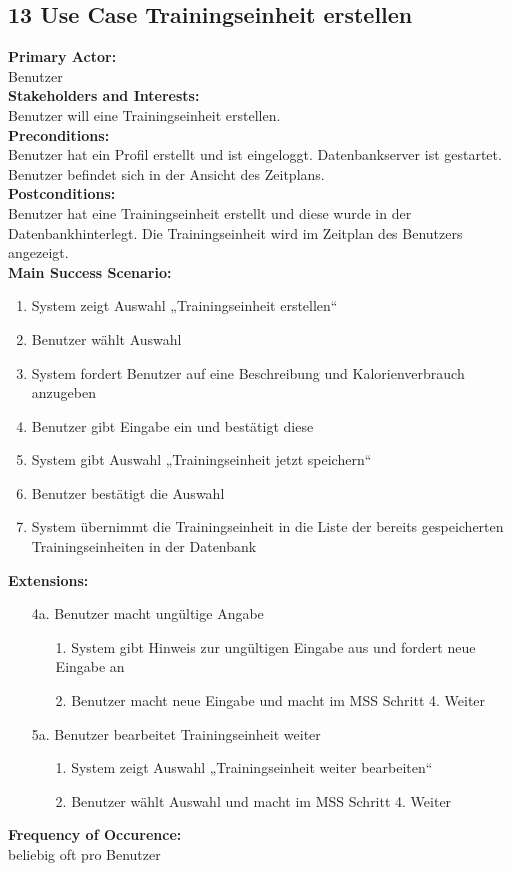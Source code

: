 \documentclass[12pt,a4paper,onecolumn]{article}
\begin{document}
\subsection{13 Use Case  Trainingseinheit erstellen}
\textbf{Primary Actor:}\\ Benutzer\\
\textbf{Stakeholders and Interests:}\\
Benutzer will eine \gls{Trainingseinheit} erstellen.\\
\textbf{Preconditions:} \\ Benutzer hat ein Profil erstellt und ist eingeloggt. 
Datenbankserver ist gestartet. Benutzer befindet sich in der Ansicht des \gls{Zeitplan}s.\\
\textbf{Postconditions:}\\Benutzer hat eine \gls{Trainingseinheit} erstellt und diese wurde in der Datenbankhinterlegt. Die Trainingseinheit wird im \gls{Zeitplan} des Benutzers angezeigt.\\
\textbf{Main Success Scenario:}
\begin{enumerate}
    \item System zeigt Auswahl „\gls{Trainingseinheit} erstellen“
    \item Benutzer wählt Auswahl
    \item System fordert Benutzer auf eine Beschreibung und Kalorienverbrauch anzugeben
    \item Benutzer gibt Eingabe ein und bestätigt diese
    \item System gibt Auswahl „\gls{Trainingseinheit} jetzt speichern“
    \item Benutzer bestätigt die Auswahl
    \item System übernimmt die \gls{Trainingseinheit} in die Liste der bereits gespeicherten \gls{Trainingseinheit}en in der Datenbank
\end{enumerate}
\textbf{Extensions:}
\begin{enumerate}
    \item [4a.]   Benutzer macht ungültige Angabe
    \begin{enumerate}
        \item[1.]System gibt Hinweis zur ungültigen Eingabe aus und fordert neue Eingabe an
        \item[2.]Benutzer macht neue Eingabe und macht im MSS Schritt 4. Weiter
    \end{enumerate}
    \item [5a.]Benutzer bearbeitet \gls{Trainingseinheit} weiter
    \begin{enumerate}
        \item[1.]System zeigt Auswahl „\gls{Trainingseinheit} weiter bearbeiten“
        \item[2.]Benutzer wählt Auswahl und macht im MSS Schritt 4. Weiter
    \end{enumerate}
\end{enumerate}
\textbf{Frequency of Occurence:}\\beliebig oft pro Benutzer  \\
\printglossary
\end{document}
